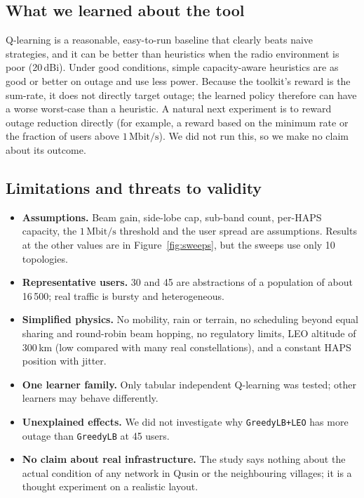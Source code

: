 \documentclass[11pt,a4paper]{article}
\newcommand{\Mbps}{\,\mathrm{Mbit/s}}
\begin{document}
\subsection{What we learned about the tool}
Q-learning is a reasonable, easy-to-run baseline that clearly beats naive strategies, and it can be better than heuristics when the radio environment is poor (20\,dBi). Under good conditions, simple capacity-aware heuristics are as good or better on outage and use less power. Because the toolkit's reward is the sum-rate, it does not directly target outage; the learned policy therefore can have a worse worst-case than a heuristic. A natural next experiment is to reward outage reduction directly (for example, a reward based on the minimum rate or the fraction of users above $1\Mbps$). We did not run this, so we make no claim about its outcome.

\subsection{Limitations and threats to validity}
\begin{itemize}
  \item \textbf{Assumptions.} Beam gain, side-lobe cap, sub-band count, per-HAPS capacity, the $1\Mbps$ threshold and the user spread are assumptions. Results at the other values are in Figure~\ref{fig:sweeps}, but the sweeps use only 10 topologies.
  \item \textbf{Representative users.} 30 and 45 are abstractions of a population of about 16\,500; real traffic is bursty and heterogeneous.
  \item \textbf{Simplified physics.} No mobility, rain or terrain, no scheduling beyond equal sharing and round-robin beam hopping, no regulatory limits, LEO altitude of 300\,km (low compared with many real constellations), and a constant HAPS position with jitter.
  \item \textbf{One learner family.} Only tabular independent Q-learning was tested; other learners may behave differently.
  \item \textbf{Unexplained effects.} We did not investigate why \texttt{GreedyLB+LEO} has more outage than \texttt{GreedyLB} at 45 users.
  \item \textbf{No claim about real infrastructure.} The study says nothing about the actual condition of any network in Qusin or the neighbouring villages; it is a thought experiment on a realistic layout.
\end{itemize}
\end{document}
